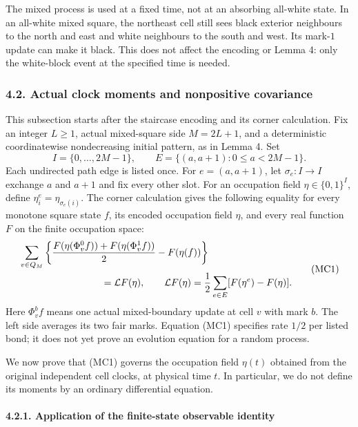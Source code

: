\documentclass[
  11pt,
  a4paper,
]{article}
\begin{document}
The mixed process is used at a fixed time, not at an absorbing all-white
state. In an all-white mixed square, the northeast cell still sees black
exterior neighbours to the north and east and white neighbours to the
south and west. Its mark-\(1\) update can make it black. This does not
affect the encoding or Lemma 4: only the white-block event at the
specified time is needed.

\subsubsection{4.2. Actual clock moments and nonpositive
covariance}\label{actual-clock-moments-and-nonpositive-covariance}

This subsection starts after the staircase encoding and its corner
calculation. Fix an integer \(L\geq1\), actual mixed-square side
\(M=2L+1\), and a deterministic coordinatewise nondecreasing initial
pattern, as in Lemma 4. Set \[
I=\{0,\ldots,2M-1\},\qquad
E=\{(a,a+1):0\leq a<2M-1\}.
\] Each undirected path edge is listed once. For \(e=(a,a+1)\), let
\(\sigma_e:I\to I\) exchange \(a\) and \(a+1\) and fix every other slot.
For an occupation field \(\eta\in\{0,1\}^{I}\), define
\(\eta^e_i=\eta_{\sigma_e(i)}\). The corner calculation gives the
following equality for every monotone square state \(f\), its encoded
occupation field \(\eta\), and every real function \(F\) on the finite
occupation space: \[
\begin{aligned}
&\sum_{v\in Q_M}\left\{
\frac{F(\eta(\Phi_v^0 f))+F(\eta(\Phi_v^1 f))}{2}
-F(\eta(f))\right\}\\
&\hspace{30mm}=\mathcal L F(\eta),\qquad
\mathcal L F(\eta)=\frac12\sum_{e\in E}[F(\eta^e)-F(\eta)].
\end{aligned}
\tag{MC1}
\] Here \(\Phi_v^b f\) means one actual mixed-boundary update at cell
\(v\) with mark \(b\). The left side averages its two fair marks.
Equation (MC1) specifies rate \(1/2\) per listed bond; it does not yet
prove an evolution equation for a random process.

We now prove that (MC1) governs the occupation field \(\eta(t)\)
obtained from the original independent cell clocks, at physical time
\(t\). In particular, we do not define its moments by an ordinary
differential equation.

\paragraph{4.2.1. Application of the finite-state observable
identity}\label{application-of-the-finite-state-observable-identity}
\end{document}
